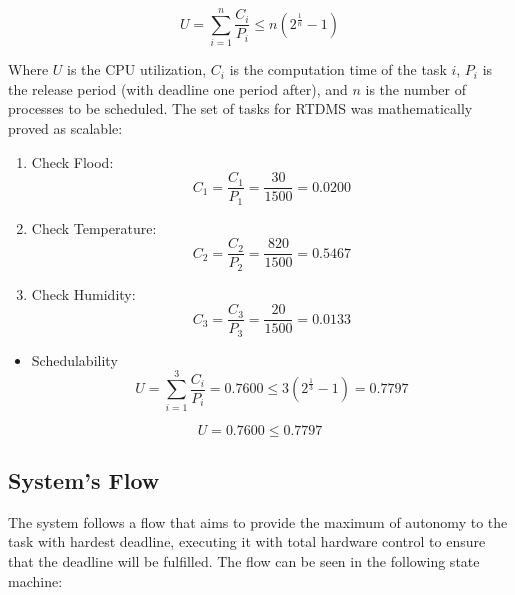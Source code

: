 \documentclass[12pt]{article}
\begin{document}
\[ \displaystyle U = \sum_{i=1}^{n}\frac{C_i}{P_i} \leq n(2^\frac{1}{n} - 1) \]

Where \(U\) is the CPU utilization, \(C_i\) is the computation time of the task \(i\), \(P_i\) is the release period (with deadline one period after),
and \(n\) is the number of processes to be scheduled. The set of tasks for RTDMS was mathematically proved as scalable:

\begin{enumerate}
 \item Check Flood: \[ C_1 = \frac{C_1}{P_1} = \frac{30}{1500} = 0.0200 \]
 \item Check Temperature: \[ C_2 = \frac{C_2}{P_2} = \frac{820}{1500} = 0.5467 \]
 \item Check Humidity: \[ C_3 = \frac{C_3}{P_3} = \frac{20}{1500} = 0.0133 \]
\end{enumerate}
\begin{itemize}
 \item Schedulability \[ U = \sum_{i=1}^{3}\frac{C_i}{P_i} = 0.7600 \leq 3(2^\frac{1}{3} - 1) = 0.7797 \]
\end{itemize}

\[ U = 0.7600 \leq 0.7797 \]

\subsection{System's Flow}
The system follows a flow that aims to provide the maximum of autonomy to the task with hardest deadline, executing
it with total hardware control to ensure that the deadline will be fulfilled. The flow can be seen in the following
state machine:
\end{document}
